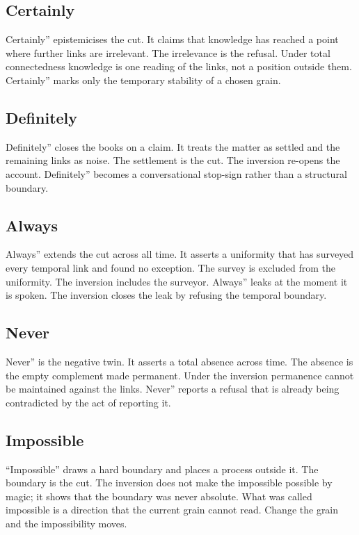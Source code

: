 \documentclass[11pt,a4paper]{article}
\begin{document}
\subsection{Certainly} Certainly'' epistemicises the cut. It claims that knowledge has reached a point where further links are irrelevant. The irrelevance is the refusal. Under total connectedness knowledge is one reading of the links, not a position outside them. Certainly'' marks only the temporary stability of a chosen grain.

\subsection{Definitely} Definitely'' closes the books on a claim. It treats the matter as settled and the remaining links as noise. The settlement is the cut. The inversion re-opens the account. Definitely'' becomes a conversational stop-sign rather than a structural boundary.

\subsection{Always} Always'' extends the cut across all time. It asserts a uniformity that has surveyed every temporal link and found no exception. The survey is excluded from the uniformity. The inversion includes the surveyor. Always'' leaks at the moment it is spoken. The inversion closes the leak by refusing the temporal boundary.

\subsection{Never} Never'' is the negative twin. It asserts a total absence across time. The absence is the empty complement made permanent. Under the inversion permanence cannot be maintained against the links. Never'' reports a refusal that is already being contradicted by the act of reporting it.

\subsection{Impossible} ``Impossible'' draws a hard boundary and places a process outside it. The boundary is the cut. The inversion does not make the impossible possible by magic; it shows that the boundary was never absolute. What was called impossible is a direction that the current grain cannot read. Change the grain and the impossibility moves.
\end{document}
